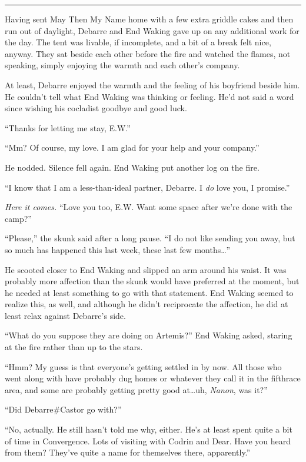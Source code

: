 \begin{center}\rule{0.5\linewidth}{0.5pt}\end{center}

Having sent May Then My Name home with a few extra griddle cakes and then run out of daylight, Debarre and End Waking gave up on any additional work for the day. The tent was livable, if incomplete, and a bit of a break felt nice, anyway. They sat beside each other before the fire and watched the flames, not speaking, simply enjoying the warmth and each other's company.

At least, Debarre enjoyed the warmth and the feeling of his boyfriend beside him. He couldn't tell what End Waking was thinking or feeling. He'd not said a word since wishing his cocladist goodbye and good luck.

``Thanks for letting me stay, E.W.''

``Mm? Of course, my love. I am glad for your help and your company.''

He nodded. Silence fell again. End Waking put another log on the fire.

``I know that I am a less-than-ideal partner, Debarre. I \emph{do} love you, I promise.''

\emph{Here it comes.} ``Love you too, E.W. Want some space after we're done with the camp?''

``Please,'' the skunk said after a long pause. ``I do not like sending you away, but so much has happened this last week, these last few months\ldots{}''

He scooted closer to End Waking and slipped an arm around his waist. It was probably more affection than the skunk would have preferred at the moment, but he needed at least something to go with that statement. End Waking seemed to realize this, as well, and although he didn't reciprocate the affection, he did at least relax against Debarre's side.

``What do you suppose they are doing on Artemis?'' End Waking asked, staring at the fire rather than up to the stars.

``Hmm? My guess is that everyone's getting settled in by now. All those who went along with have probably dug homes or whatever they call it in the fifthrace area, and some are probably getting pretty good at\ldots uh, \emph{Nanon}, was it?''

``Did Debarre\#Castor go with?''

``No, actually. He still hasn't told me why, either. He's at least spent quite a bit of time in Convergence. Lots of visiting with Codrin and Dear. Have you heard from them? They've quite a name for themselves there, apparently.''

